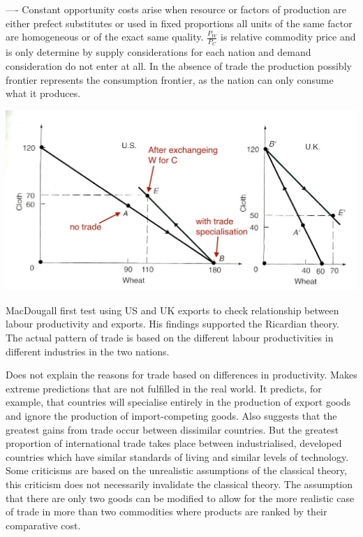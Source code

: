 \documentclass[12pt]{examnotes}
\begin{document}
----
\ra Constant opportunity costs arise when 
 resource or factors of production are either prefect substitutes or used in fixed proportions 
 all units of the same factor are homogeneous or of the exact same quality.
\ra $\displaystyle\frac{P_W}{P_C}$ is relative commodity price and is only determine by supply considerations for each nation and demand consideration do not enter at all.
\ra In the absence of trade the production possibly frontier represents the consumption frontier, as the nation can only consume what it produces.

\includegraphics[scale=0.4]{./imgs/22c.jpg}

\ra MacDougall first test using US and UK exports to check relationship between labour productivity and exports. His findings supported the Ricardian theory. The actual pattern of trade is based on the different labour productivities in different industries in the two nations. 

\ra Does not explain the reasons for trade based on differences in productivity. 
\ra Makes extreme predictions that are not fulfilled in the real world. It predicts, for example, that countries will specialise entirely in the production of export goods and ignore the production of import-competing goods. 
\ra Also suggests that the greatest gains from trade occur between dissimilar countries. But the greatest proportion of international trade takes place between industrialised, developed countries which have similar standards of living and similar levels of technology.
\ra Some criticisms are based on the unrealistic assumptions of the classical theory, this criticism does not necessarily invalidate the classical theory. The assumption that there are only two goods can be modified to allow for the more realistic case of trade in more than two commodities where products are ranked by their comparative cost.
\clearpage
\end{document}
